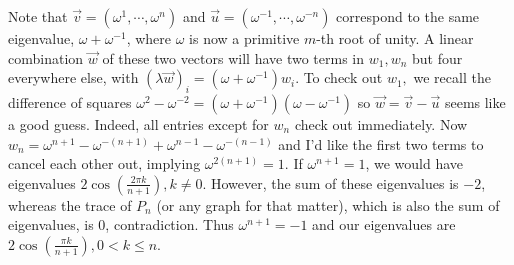 \begin{solution}
    Note that $\vec v = \left(\omega^1, \cdots , \omega^{n}\right)$ and 
    $\vec u = \left(\omega^{-1}, \cdots , \omega^{-n}\right)$ correspond to the 
    same eigenvalue, $\omega + \omega^{-1}$, where $\omega$ is now a primitive $m$-th root of unity. 
    A linear combination $\vec w$ of these two vectors will have two terms in $w_1, w_n$ but four 
    everywhere else, with $\left(\lambda\vec w\right)_i = \left(\omega + \omega^{-1}\right)w_i$. 
    To check out $w_1,$ we recall the difference of squares $\omega^2 - \omega^{-2} = \left(\omega + \omega^{-1}\right)\left(\omega - \omega^{-1}\right)$ 
    so $\vec w = \vec v - \vec u$ seems like a good guess. Indeed, all entries except for $w_n$ check out immediately. 
    Now $w_n = \omega^{n + 1} - \omega^{-(n + 1)} + \omega^{n - 1} - \omega^{-(n - 1)}$ and I'd like the first 
    two terms to cancel each other out, implying $\omega^{2(n + 1)} = 1$. If $\omega^{n + 1} = 1$, 
    we would have eigenvalues $2\cos\left(\frac{2\pi k}{n + 1}\right), k \neq 0$. However, 
    the sum of these eigenvalues is $-2$, whereas the trace of $P_n$ (or any graph for that matter), 
    which is also the sum of eigenvalues, is $0$, contradiction. Thus $\omega^{n + 1} = -1$ 
    and our eigenvalues are $2\cos\left(\frac{\pi k}{n + 1}\right), 0 < k \leq n$.
\end{solution}\bigskip
